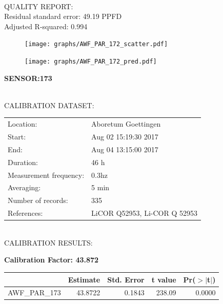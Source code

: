 \documentclass[oneside]{report}
\begin{document}
\hrulefill\\
QUALITY REPORT:\\
Residual standard error: 49.19 PPFD\\
Adjusted R-squared: 0.994



\begin{figure}[H]
  \centering
  \texttt{[image: graphs/AWF\_PAR\_172\_scatter.pdf]}
\end{figure}




\begin{figure}[H]
  \centering
  \texttt{[image: graphs/AWF\_PAR\_172\_pred.pdf]}
\end{figure}

\pagebreak


\begin{center}
\large{\textbf{SENSOR:173}}\\
\end{center}

\hrulefill\\
CALIBRATION DATASET:\\
\begin{table}[h!]
  \centering
  \label{tab:table1}
  \begin{tabular}{ll}
    Location: & Aboretum Goettingen\\ 
    
    
    Start:  & Aug 02 15:19:30 2017 \\
    End:   & Aug 04 13:15:00 2017\\ 
    Duration: & 46 h\\
    Measurement frequency: & 0.3hz\\
    Averaging:  &5 min\\
    Number of records: & 335 \\
    References: & LiCOR Q52953, Li-COR Q 52953 \\
  \end{tabular}
\end{table}

\hrulefill\\
CALIBRATION RESULTS:\\


\begin{center}
\textbf{\large{Calibration Factor: 43.872}}\\
\end{center}
\begin{table}[ht]
\centering
\begin{tabular}{rrrrr}
  \hline
 & Estimate & Std. Error & t value & Pr($>$$|$t$|$) \\ 
  \hline
AWF\_PAR\_173 & 43.8722 & 0.1843 & 238.09 & 0.0000 \\ 
   \hline
\end{tabular}
\end{table}
\end{document}
